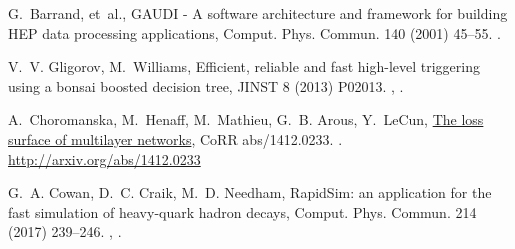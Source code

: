 \documentclass[final,5p,times,twocolumn]{elsarticle}
\begin{document}
\begin{thebibliography}{10}
G.~Barrand, et~al., {GAUDI - A software architecture and framework for building
  HEP data processing applications}, Comput. Phys. Commun. 140 (2001) 45--55.
\newblock \href {http://dx.doi.org/10.1016/S0010-4655(01)00254-5}
  {}.

V.~V. Gligorov, M.~Williams, {Efficient, reliable and fast high-level
  triggering using a bonsai boosted decision tree}, JINST 8 (2013) P02013.
\newblock \href {http://arxiv.org/abs/1210.6861} {},
  \href {http://dx.doi.org/10.1088/1748-0221/8/02/P02013}
  {}.

A.~Choromanska, M.~Henaff, M.~Mathieu, G.~B. Arous, Y.~LeCun,
  \href{http://arxiv.org/abs/1412.0233}{The loss surface of multilayer
  networks}, CoRR abs/1412.0233.
\newblock \href {http://arxiv.org/abs/1412.0233} {}.
\newline\urlprefix\url{http://arxiv.org/abs/1412.0233}

G.~A. Cowan, D.~C. Craik, M.~D. Needham, {RapidSim: an application for the fast
  simulation of heavy-quark hadron decays}, Comput. Phys. Commun. 214 (2017)
  239--246.
\newblock \href {http://arxiv.org/abs/1612.07489} {},
  \href {http://dx.doi.org/10.1016/j.cpc.2017.01.029}
  {}.

\end{thebibliography}
\end{document}
